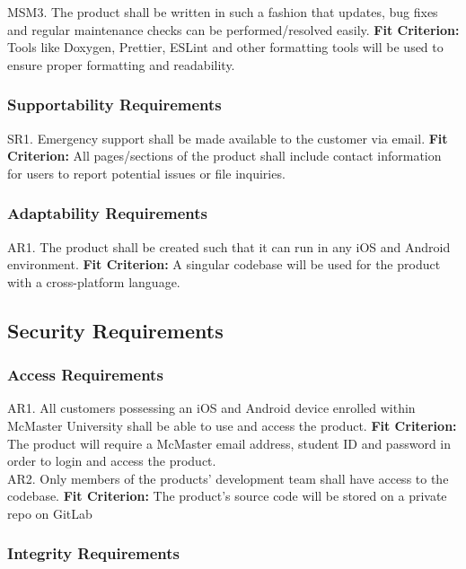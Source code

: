 \documentclass[12pt, titlepage]{article}
\begin{document}
\noindent MSM3. The product shall be written in such a fashion that updates, bug fixes and regular maintenance checks can be performed/resolved easily.
	\textbf{Fit Criterion:} Tools like Doxygen, Prettier, ESLint and other formatting tools will be used to ensure proper formatting and readability.

\subsubsection{Supportability Requirements}

SR1. Emergency support shall be made available to the customer via email.
	\textbf{Fit Criterion:} All pages/sections of the product shall include contact information for users to report potential issues or file inquiries. 

\subsubsection{Adaptability Requirements}

AR1. The product shall be created such that it can run in any iOS and Android environment.
	\textbf{Fit Criterion:} A singular codebase will be used for the product with a cross-platform language.

\subsection{Security Requirements}

\subsubsection{Access Requirements}

AR1. All customers possessing an iOS and Android device enrolled within McMaster University shall be able to use and access the product.
	\textbf{Fit Criterion:} The product will require a McMaster email address, student ID and password in order to login and access the product. \\

\noindent AR2. Only members of the products’ development team shall have access to the codebase.
	\textbf{Fit Criterion:} The product’s source code will be stored on a private repo on GitLab

\subsubsection{Integrity Requirements}
\end{document}
